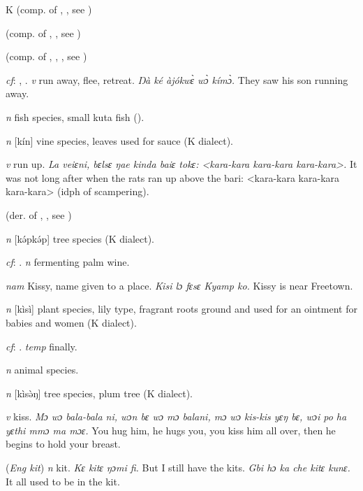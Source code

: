 \begin{letter}{K}
 (comp. of , , see ) 

 (comp. of , , see ) 

 (comp. of , , , see ) 

 \textit{cf}: , . \textit{v} run away, flee, retreat. \textit{Ŋà ké àjókwɛ̀ wɔ̀ kímɔ̀.} They saw his son running away.

 \textit{n} fish species, small kuta fish (\citealt{Pichl1967}). 

 \textit{n} [kín] vine species, leaves used for sauce (K dialect). 

 \textit{v} run up. \textit{La veiɛni, bɛlsɛ ŋae kinda baiɛ tokɛ: <kara-kara kara-kara kara-kara>.} It was not long after when the rats ran up above the bari: <kara-kara kara-kara kara-kara> (idph of scampering). 

 (der. of , , see ) 

 \textit{n} [kǝ́pkǝ́p] tree species (K dialect). 

 \textit{cf}: . \textit{n} fermenting palm wine.

 \textit{nam} Kissy, name given to a place. \textit{Kisi lɔ fɛsɛ Kyamp ko.} Kissy is near Freetown.

 \textit{n} [kìsì] plant species, lily type, fragrant roots ground and used for an ointment for babies and women (K dialect).

 \textit{cf}: . \textit{temp} finally.

 \textit{n} animal species.

 \textit{n} [kìsǝ̀ŋ] tree species, plum tree (K dialect). 

 \textit{v} kiss. \textit{Mɔ wɔ bala-bala ni, wɔn bɛ wɔ mɔ balani, mɔ wɔ kis-kis yɛŋ bɛ, wɔi po ha yɛthi mmɔ ma mɔɛ.} You hug him, he hugs you, you kiss him all over, then he begins to hold your breast.

 (\textit{Eng kit}) \textit{n} kit. \textit{Kɛ kitɛ ŋɔmi fi.} But I still have the kits. \textit{Gbi hɔ ka che kitɛ kunɛ.} It all used to be in the kit.


\end{letter}
